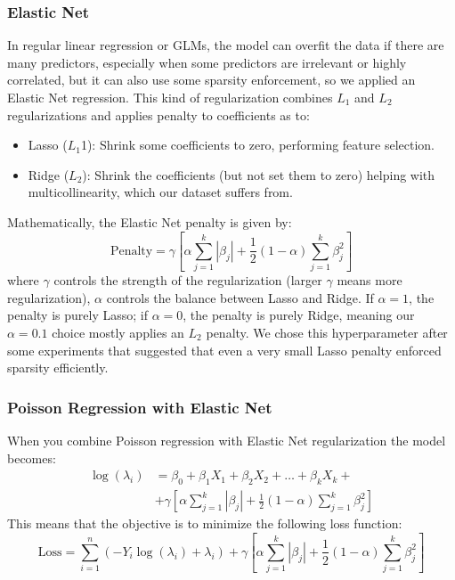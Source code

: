 \documentclass[a4paper, 8pt]{article}
\begin{document}
\begin{multicols}{2}
\subsubsection{Elastic Net}
In regular linear regression or GLMs, the model can overfit the data if there are many predictors, especially when some predictors are irrelevant or highly correlated, but it can also use some sparsity enforcement, so we applied an Elastic Net regression. This kind of regularization combines $L_1$ and $L_2$ regularizations and applies penalty to coefficients as to: 
\begin{itemize}
\item Lasso ($L_1$1): Shrink some coefficients to zero, performing feature selection.
\item Ridge ($L_2$): Shrink the coefficients (but not set them to zero) helping with multicollinearity, which our dataset suffers from.
\end{itemize}
Mathematically, the Elastic Net penalty is given by:
\begin{equation}
\text{Penalty}= \gamma \left[\alpha \sum_{j=1}^k|\beta_j| + \frac{1}{2}(1-\alpha)\sum_{j=1}^k\beta_{j}^{2} \right]
\end{equation} 
where $\gamma$ controls the strength of the regularization (larger $\gamma$ means more regularization), $\alpha$ controls the balance between Lasso and Ridge. If $\alpha=1$, the penalty is purely Lasso; if $\alpha=0$, the penalty is purely Ridge, meaning our $\alpha = 0.1$ choice mostly applies an $L_2$ penalty. We chose this hyperparameter after some experiments that suggested that even a very small Lasso penalty enforced sparsity efficiently.
\subsubsection{Poisson Regression with Elastic Net}
When you combine Poisson regression with Elastic Net regularization the model becomes:
\begin{equation}
\begin{split}
\log(\lambda_i)&=\beta_0+\beta_1X_1+\beta_2X_2+\dots+\beta_kX_k+ \\
&+\gamma \left[\alpha \sum_{j=1}^k|\beta_j| + \frac{1}{2}(1-\alpha)\sum_{j=1}^k\beta_{j}^{2} \right]
\end{split}
\end{equation}
This means that the objective is to minimize the following loss function:
\begin{equation*}
\text{Loss}=\sum_{i=1}^n(-Y_i \log(\lambda_i)+ \lambda_i)+ \gamma \left[\alpha \sum_{j=1}^k|\beta_j| + \frac{1}{2}(1-\alpha)\sum_{j=1}^k\beta_{j}^{2} \right]
\end{equation*}


\end{multicols}
\end{document}
